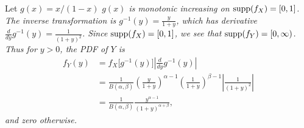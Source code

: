 \begin{exercise}
\begin{questions}
\begin{answer}
Let $g(x) = x/(1-x)$
\bit
\it $g(x)$ is monotonic increasing on $\text{supp}(f_X)=[0,1]$.
\it The inverse transformation is $g^{-1}(y) = \displaystyle\frac{y}{1+y}$, which has derivative
$\displaystyle\frac{d}{dy} g^{-1}(y) = \frac{1}{(1+y)^2}$.
\it Since $\text{supp}(f_X)=[0,1]$, we see that $\text{supp}(f_Y)=[0,\infty)$.
\eit
Thus for $y>0$, the PDF of $Y$ is
\begin{align*}
f_Y(y)
	&  = f_X\big[g^{-1}(y)\big]\left|\frac{d}{dy}g^{-1}(y)\right| \\
	& = \frac{1}{B(\alpha,\beta)}\left(\frac{y}{1+y}\right)^{\alpha-1}\left(\frac{1}{1+y}\right)^{\beta-1}\left|\frac{1}{(1+y)^2}\right| \\
	& = \frac{1}{B(\alpha,\beta)}\frac{y^{\alpha-1}}{(1+y)^{\alpha+\beta}},
\end{align*}
and zero otherwise.
\end{answer}

\end{questions}
\end{exercise}


\endinput
